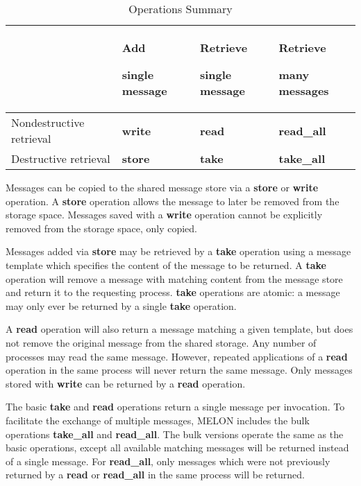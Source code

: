 \begin{table}
\centering
\caption{Operations Summary}
\begin{tabular}{|p{3cm}|p{3cm}|p{3cm}|p{3cm}|} \hline
& Add

single message & Retrieve

single message & Retrieve

many messages \\ \hline
Nondestructive retrieval & \textbf{write} & \textbf{read} & \textbf{read\_all} \\ \hline
Destructive retrieval & \textbf{store} & \textbf{take} & \textbf{take\_all} \\ \hline
\end{tabular}
\label{table:opsummary}
\end{table}

Messages can be copied to the shared message store via a \textbf{store} or \textbf{write} operation. A \textbf{store} operation allows the message to later be removed from the storage space. Messages saved with a \textbf{write} operation cannot be explicitly removed from the storage space, only copied.

Messages added via \textbf{store} may be retrieved by a \textbf{take} operation using a message template which specifies the content of the message to be returned. A \textbf{take} operation will remove a message with matching content from the message store and return it to the requesting process. \textbf{take} operations are atomic: a message may only ever be returned by a single \textbf{take} operation.

A \textbf{read} operation will also return a message matching a given template, but does not remove the original message from the shared storage. Any number of processes may read the same message. However, repeated applications of a \textbf{read} operation in the same process will never return the same message. Only messages stored with \textbf{write} can be returned by a \textbf{read} operation.

The basic \textbf{take} and \textbf{read} operations return a single message per invocation. To facilitate the exchange of multiple messages, MELON includes the bulk operations \textbf{take\_all} and \textbf{read\_all}. The bulk versions operate the same as the basic operations, except all available matching messages will be returned instead of a single message. For \textbf{read\_all}, only messages which were not previously returned by a \textbf{read} or \textbf{read\_all} in the same process will be returned.

